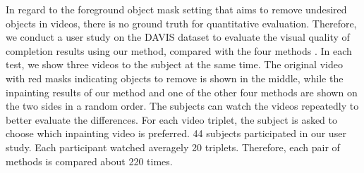 In regard to the foreground object mask setting that aims to remove undesired objects in videos, there is no ground truth for quantitative evaluation. 
Therefore, we conduct a user study on the DAVIS dataset to evaluate the visual quality of completion results using our method, compared with the four methods \cite{nazeri2019edgeconnect,wang2019video,Kim_2019_CVPR1,Xu_2019_CVPR}.
%
In each test, we show three videos to the subject at the same time. The original video with red masks indicating objects to remove is shown in the middle, while the inpainting results of our method and one of the other four methods are shown on the two sides in a random order.
%  
The subjects can watch the videos repeatedly to better evaluate the differences.
For each video triplet, the subject is asked to choose which inpainting video is preferred.
44 subjects participated in our user study. 
Each participant watched averagely 20 triplets. 
Therefore, each pair of methods is compared about 220 times.
 

\begin{table}[!t]
	\caption{Ablation studies on YouTubeVOS. Structure inference, structure attention model, and flow constrained loss are demonstrated effective in video inpainting.}\smallskip
	
	\centering
	\label{tab:abl}
\end{table}

